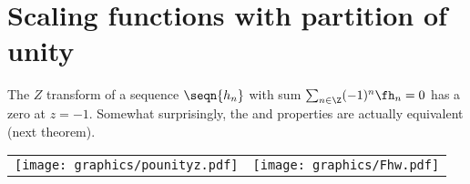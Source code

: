 \section{Scaling functions with partition of unity}

The $Z$ transform  of a sequence $\seqn{h_n}$ 
with sum $\sum_{n\in\Z} (-1)^n\fh_n=0$ has a zero at $z=-1$.
Somewhat surprisingly, the  and
 properties are actually equivalent (next theorem). 

\begin{center}
\begin{tabular}{cc}
  \texttt{[image: graphics/pounityz.pdf]}&\texttt{[image: graphics/Fhw.pdf]}
\end{tabular}
\end{center}


